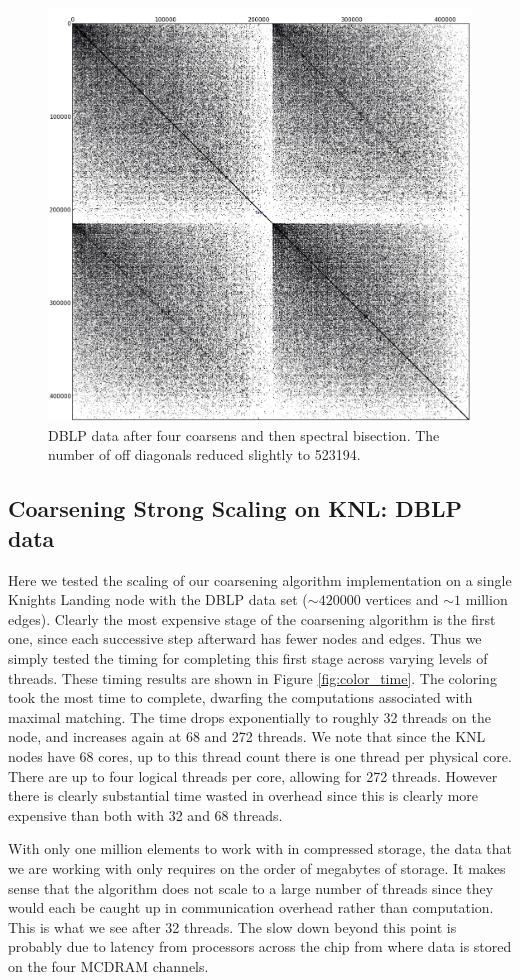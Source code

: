 \documentclass[11pt]{article}
\begin{document}
\begin{figure}
	\centering
	\includegraphics[width=0.5\linewidth]{figs/DBLP_SBC4.png}
	\caption{DBLP data after four coarsens and then spectral bisection. The
	number of off diagonals reduced slightly to 523194.}
	\label{fig:DBLP}
\end{figure}


\subsection{Coarsening Strong Scaling on KNL: DBLP data}

Here we tested the scaling of our coarsening algorithm implementation on a single
Knights Landing node with the DBLP data set ($\sim 420000$ vertices and $\sim 1$
million edges). Clearly the most expensive stage of the coarsening algorithm is
the first one, since each successive step afterward has fewer nodes and edges.
Thus we simply tested the timing for completing this first stage across varying
levels of threads. These timing results are shown in Figure
\ref{fig:color_time}. The coloring took the most time to complete, dwarfing the
computations associated with maximal matching. The time drops exponentially to
roughly 32 threads on the node, and increases again at 68 and 272 threads. We
note that since the KNL nodes have 68 cores, up to this thread count there is
one thread per physical core. There are up to four logical threads per core,
allowing for 272 threads. However there is clearly substantial time wasted in
overhead since this is clearly more expensive than both with 32 and 68 threads.

With only one million elements to work with in compressed storage, the data that
we are working with only requires on the order of megabytes of storage. It makes
sense that the algorithm does not scale to a large number of threads since they
would each be caught up in communication overhead rather than computation. This
is what we see after 32 threads. The slow down beyond this point is probably due
to latency from processors across the chip from where data is stored on the four
MCDRAM channels.
\end{document}
